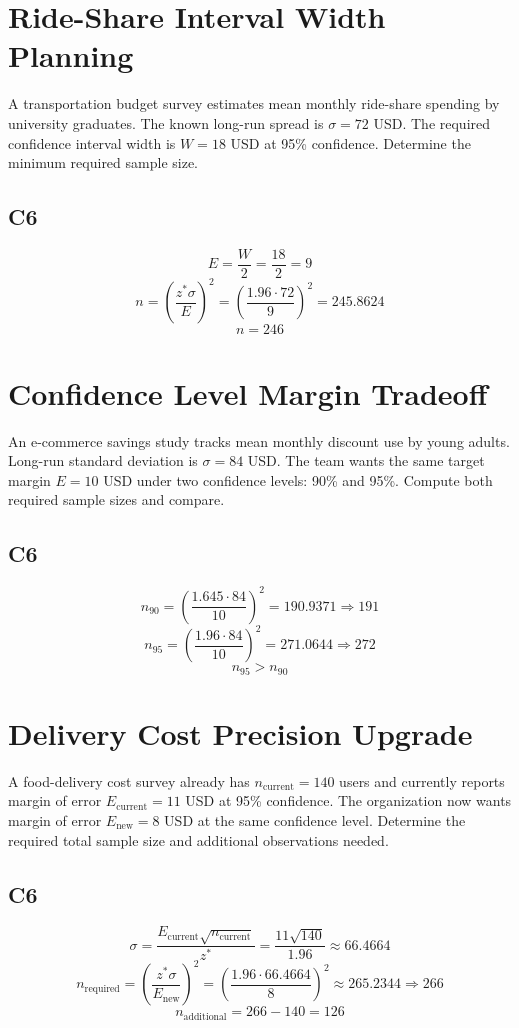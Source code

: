 \begin{ExamProblems}
		\item
		\section{Ride-Share Interval Width Planning}
		A transportation budget survey estimates mean monthly ride-share spending by university graduates. The known long-run spread is $\sigma = 72$ USD. The required confidence interval width is $W = 18$ USD at 95\% confidence. Determine the minimum required sample size.
		
		\subsection*{C6}
		\[
		E = \frac{W}{2} = \frac{18}{2} = 9
		\]
		\[
		n = \left(\frac{z^*\sigma}{E}\right)^2
		= \left(\frac{1.96 \cdot 72}{9}\right)^2
		= 245.8624
		\]
		\[
		n = 246
		\]
		
		\item
		\section{Confidence Level Margin Tradeoff}
		An e-commerce savings study tracks mean monthly discount use by young adults. Long-run standard deviation is $\sigma = 84$ USD. The team wants the same target margin $E = 10$ USD under two confidence levels: 90\% and 95\%. Compute both required sample sizes and compare.
		
		\subsection*{C6}
		\[
		n_{90} = \left(\frac{1.645 \cdot 84}{10}\right)^2 = 190.9371 \Rightarrow 191
		\]
		\[
		n_{95} = \left(\frac{1.96 \cdot 84}{10}\right)^2 = 271.0644 \Rightarrow 272
		\]
		\[
		n_{95} > n_{90}
		\]
		
		\item
		\section{Delivery Cost Precision Upgrade}
		A food-delivery cost survey already has $n_{\text{current}} = 140$ users and currently reports margin of error $E_{\text{current}} = 11$ USD at 95\% confidence. The organization now wants margin of error $E_{\text{new}} = 8$ USD at the same confidence level. Determine the required total sample size and additional observations needed.
		
		\subsection*{C6}
		\[
		\sigma = \frac{E_{\text{current}}\sqrt{n_{\text{current}}}}{z^*}
		= \frac{11\sqrt{140}}{1.96}
		\approx 66.4664
		\]
		\[
		n_{\text{required}} = \left(\frac{z^*\sigma}{E_{\text{new}}}\right)^2
		= \left(\frac{1.96 \cdot 66.4664}{8}\right)^2
		\approx 265.2344
		\Rightarrow 266
		\]
		\[
		n_{\text{additional}} = 266 - 140 = 126
		\]
		

\end{ExamProblems}
